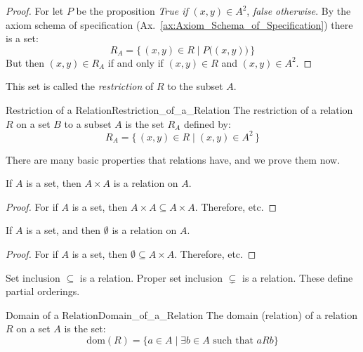     \begin{proof}
        For let $P$ be the proposition \textit{True if} $(x,y)\in{A}^{2}$,
        \textit{false otherwise}. By the axiom schema of specification
        (Ax.~\ref{ax:Axiom_Schema_of_Specification}) there is a set:
        \begin{equation}
            R_{A}=\big\{\,(x,y)\in{R}\;|\;P\big((x,y)\big)\,\big\}
        \end{equation}
        But then $(x,y)\in{R}_{A}$ if and only if $(x,y)\in{R}$ and
        $(x,y)\in{A}^{2}$.
    \end{proof}
    This set is called the \textit{restriction} of $R$ to the subset $A$.
    \begin{fdefinition}{Restriction of a Relation}{Restriction_of_a_Relation}
        The restriction of a relation $R$ on a set $B$ to a subset $A$ is the
        set $R_{A}$ defined by:
        \begin{equation*}
            R_{A}=\big\{\,(x,y)\in{R}\;|\;(x,y)\in{A}^{2}\,\big\}
        \end{equation*}
    \end{fdefinition}
    There are many basic properties that relations have, and we prove them now.
    \begin{theorem}
        \label{thm:Cartesian_Product_Is_Relation}%
        If $A$ is a set, then $A\times{A}$ is a relation on $A$.
    \end{theorem}
    \begin{proof}
        For if $A$ is a set, then
        $A\times{A}\subseteq{A}\times{A}$. Therefore, etc.
    \end{proof}
    \begin{theorem}
        \label{thm:Empty_Set_Is_Relation}%
        If $A$ is a set, and then $\emptyset$ is a relation
        on $A$.
    \end{theorem}
    \begin{proof}
        For if $A$ is a set, then
        $\emptyset\subseteq{A}\times{A}$. Therefore, etc.
    \end{proof}
    \begin{theorem}
        Set inclusion $\subseteq$ is a relation. Proper set inclusion
        $\subsetneq$ is a relation. These define partial orderings.
    \end{theorem}
    \begin{fdefinition}{Domain of a Relation}{Domain_of_a_Relation}
        The \gls{domain (relation)} of a \gls{relation} $R$ on a \gls{set} $A$
        is the set:
        \begin{equation*}
            \textrm{dom}(R)=\big\{a\in{A}\;|\;\exists{b}\in{A}
                \textrm{ such that }aRb\big\}
        \end{equation*}
    \end{fdefinition}
